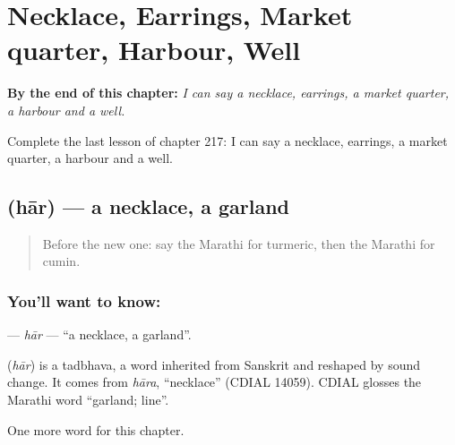 
\chapter{Necklace, Earrings, Market quarter, Harbour, Well}
\label{ch:mr-necklace-earrings-market-quarter-harbour-well}

\begin{chapteropening}
\textbf{By the end of this chapter:} \emph{I can say a necklace, earrings, a market quarter, a harbour and a well.}

Complete the last lesson of chapter 217: I can say a necklace, earrings, a market quarter, a harbour and a well.
\end{chapteropening}

\section[\texorpdfstring{\mr{हार} (hār)}{हार (hār)}]{ (hār) — a necklace, a garland}

\label{lesson:MR-C217-har}



\begin{quote}
Before the new one: say the Marathi for turmeric, then the Marathi for cumin.
\end{quote}

\subsection*{You'll want to know: }
\textbf{} — \emph{hār} — \textquotedblleft{}a necklace, a garland\textquotedblright{}.

\begin{cousinweb}
\textbf{} (\emph{hār}) is a tadbhava, a word inherited from Sanskrit and reshaped by sound change. It comes from \emph{hāra}, \textquotedblleft{}necklace\textquotedblright{} (CDIAL 14059). CDIAL glosses the Marathi word \textquotedblleft{}garland; line\textquotedblright{}.
\end{cousinweb}

\begin{grammarlens}[title={What you've built}]
One more word for this chapter.
\end{grammarlens}

